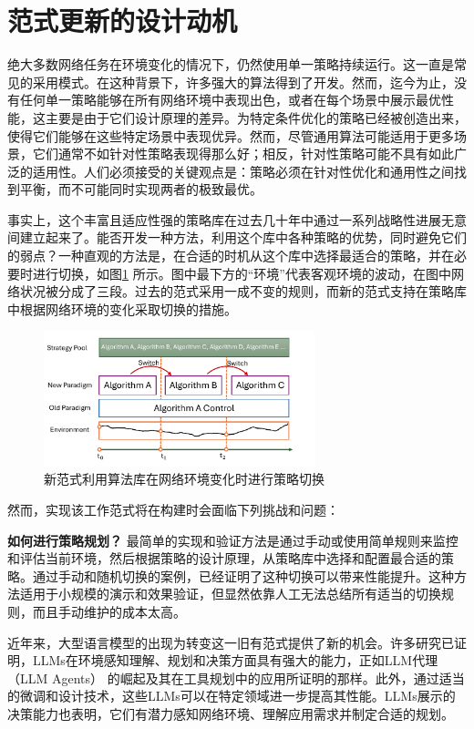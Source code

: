 \section{范式更新的设计动机}
绝大多数网络任务在环境变化的情况下，仍然使用单一策略持续运行。这一直是常见的采用模式。在这种背景下，许多强大的算法得到了开发。然而，迄今为止，没有任何单一策略能够在所有网络环境中表现出色，或者在每个场景中展示最优性能，这主要是由于它们设计原理的差异。为特定条件优化的策略已经被创造出来，使得它们能够在这些特定场景中表现优异。然而，尽管通用算法可能适用于更多场景，它们通常不如针对性策略表现得那么好；相反，针对性策略可能不具有如此广泛的适用性。人们必须接受的关键观点是：策略必须在针对性优化和通用性之间找到平衡，而不可能同时实现两者的极致最优。

事实上，这个丰富且适应性强的策略库在过去几十年中通过一系列战略性进展无意间建立起来了。能否开发一种方法，利用这个库中各种策略的优势，同时避免它们的弱点？一种直观的方法是，在合适的时机从这个库中选择最适合的策略，并在必要时进行切换，如图\ref{fig_paradigm_change} 所示。图中最下方的“环境”代表客观环境的波动，在图中网络状况被分成了三段。过去的范式采用一成不变的规则，而新的范式支持在策略库中根据网络环境的变化采取切换的措施。

\begin{figure} [ht]
\centering
\includegraphics[width=0.7\textwidth]{figures/chap04/Paradigm_change.pdf} 
\caption{新范式利用算法库在网络环境变化时进行策略切换}
\label{fig_paradigm_change}
\end{figure}

然而，实现该工作范式将在构建时会面临下列挑战和问题：

\textbf{如何进行策略规划？} 最简单的实现和验证方法是通过手动或使用简单规则来监控和评估当前环境，然后根据策略的设计原理，从策略库中选择和配置最合适的策略。通过手动和随机切换的案例，已经证明了这种切换可以带来性能提升。这种方法适用于小规模的演示和效果验证，但显然依靠人工无法总结所有适当的切换规则，而且手动维护的成本太高。

近年来，大型语言模型的出现为转变这一旧有范式提供了新的机会。许多研究已证明，LLMs在环境感知理解、规划和决策方面具有强大的能力，正如LLM代理（LLM Agents）\cite{wang2024survey} 的崛起及其在工具规划中的应用所证明的那样。此外，通过适当的微调和设计技术，这些LLMs可以在特定领域进一步提高其性能。LLMs展示的决策能力也表明，它们有潜力感知网络环境、理解应用需求并制定合适的规划。

